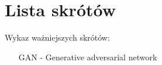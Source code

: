 \section*{Lista skrótów} %

  \bigskip
  Wykaz ważniejszych skrótów:

    \begin{itemize}
      \item[GAN] - Generative adversarial network
    \end{itemize}
